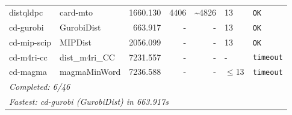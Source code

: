 \begin{longtable}{llrrrl p{}}
distqldpc & card-mto & 1660.130 & 4406 & \textasciitilde{}4826 & 13 & \texttt{OK} \\
cd-gurobi & GurobiDist & 663.917 & - & - & 13 & \texttt{OK} \\
cd-mip-scip & MIPDist & 2056.099 & - & - & 13 & \texttt{OK} \\
cd-m4ri-cc & dist\_m4ri\_CC & 7231.557 & - & - & - & \texttt{timeout} \\
cd-magma & magmaMinWord & 7236.588 & - & - & $\leq$13 & \texttt{timeout} \\
\midrule
\multicolumn{7}{l}{\textit{Completed: 6/46}} \\
\multicolumn{7}{l}{\textit{Fastest: cd-gurobi (GurobiDist) in 663.917s}} \\
\end{longtable}
